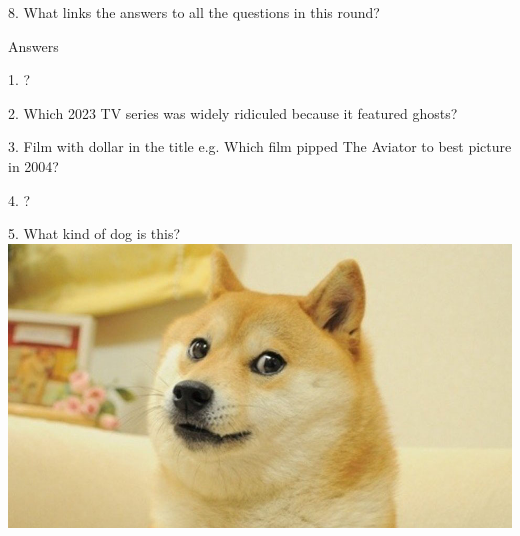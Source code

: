 \begin{frame}
\begin{center}
\Large
8. What links the answers to all the questions in this round?
\end{center}
\end{frame}
\begin{frame}
\begin{center}
\Huge
Answers
\end{center}
\end{frame}
\begin{frame}
\begin{center}
\Large
1. ?
\\
\end{center}
\end{frame}
\begin{frame}
\begin{center}
\Large
2. Which 2023 TV series was widely ridiculed because it featured ghosts?
\\
\end{center}
\end{frame}
\begin{frame}
\begin{center}
\Large
3. Film with dollar in the title e.g. Which film pipped The Aviator to best picture in 2004?
\\
\end{center}
\end{frame}
\begin{frame}
\begin{center}
\Large
4. ?
\\
\end{center}
\end{frame}
\begin{frame}
\begin{center}
\Large
5. What kind of dog is this?
\\
\vspace{0.5em}\includegraphics[height=0.6\paperheight]{images/doge.jpg}
\\
\end{center}
\end{frame}

